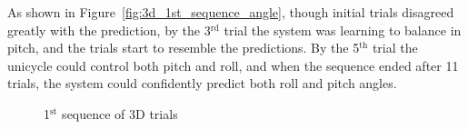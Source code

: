 \documentclass{IIBproject}
\begin{document}
As shown in Figure~\ref{fig:3d_1st_sequence_angle}, though initial trials
disagreed greatly with the prediction, by the 3$^\textrm{rd}$ trial the system
was learning to balance in pitch, and the trials start to resemble the
predictions. By the 5$^\textrm{th}$ trial the unicycle could control both
pitch and roll, and when the sequence ended after 11 trials, the system could
confidently predict both roll and pitch angles.

\begin{figure}[htpb]
  \begin{center}
    \end{center}
    \caption{1$^\textrm{st}$ sequence of 3D trials}
    \label{fig:3d_1st_sequence}
    \end{figure}
\end{document}
